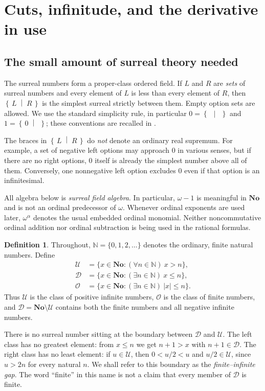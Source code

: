 \documentclass[11pt,letterpaper]{article}
\numberwithin{equation}{section}
\theoremstyle{definition}
\newtheorem{definition}[theorem]{Definition}
\theoremstyle{remark}
\newcommand{\No}{\mathbf{No}}
\newcommand{\N}{\mathbb{N}}
\newcommand{\Fin}{\mathcal{O}}
\newcommand{\U}{\mathcal{U}}
\newcommand{\D}{\mathcal{D}}
\newcommand{\cut}[2]{\left\{\,#1\;\middle|\;#2\,\right\}}
\newcommand{\source}[2]{\cite[#1]{#2}}
\begin{document}
\section{Cuts, infinitude, and the derivative in use}\label{sec:prelim}
\subsection{The small amount of surreal theory needed}
The surreal numbers form a proper-class ordered field. If $L$ and $R$ are
\emph{sets} of surreal numbers and every element of $L$ is less than every
element of $R$, then $\cut{L}{R}$ is the simplest surreal strictly between
them. Empty option sets are allowed. We use the standard simplicity rule,
in particular $0=\cut{}{}$ and $1=\cut{0}{}$; these conventions are recalled
in \source{Section~2.1}{RSS}.

The braces in $\cut{L}{R}$ do \emph{not} denote an ordinary real supremum.
For example, a set of negative left options may approach $0$ in various
senses, but if there are no right options, $0$ itself is already the simplest
number above all of them. Conversely, one nonnegative left option excludes
$0$ even if that option is an infinitesimal.

All algebra below is \emph{surreal field algebra}. In particular, $\omega-1$
is meaningful in $\No$ and is not an ordinal predecessor of $\omega$.
Whenever ordinal exponents are used later, $\omega^\alpha$ denotes the
usual embedded ordinal monomial. Neither noncommutative ordinal addition
nor ordinal subtraction is being used in the rational formulas.

\begin{definition}\label{def:gap}
Throughout, $\N=\{0,1,2,\ldots\}$ denotes the ordinary, finite natural
numbers. Define
\begin{align}
 \U&=\{x\in\No:(\forall n\in\N)\ x>n\},\\
 \D&=\{x\in\No:(\exists n\in\N)\ x\le n\},\\
 \Fin&=\{x\in\No:(\exists n\in\N)\ |x|\le n\}.
\end{align}
Thus $\U$ is the class of positive infinite numbers, $\Fin$ is the class of
finite numbers, and $\D=\No\setminus\U$ contains both the finite numbers
and all negative infinite numbers.
\end{definition}

There is no surreal number sitting at the boundary between $\D$ and $\U$.
The left class has no greatest element: from $x\le n$ we get $n+1>x$ with
$n+1\in\D$. The right class has no least element: if $u\in\U$, then
$0<u/2<u$ and $u/2\in\U$, since $u>2n$ for every natural $n$.
We shall refer to this boundary as the \emph{finite--infinite gap}. The
word ``finite'' in this name is not a claim that every member of $\D$ is
finite.
\end{document}
